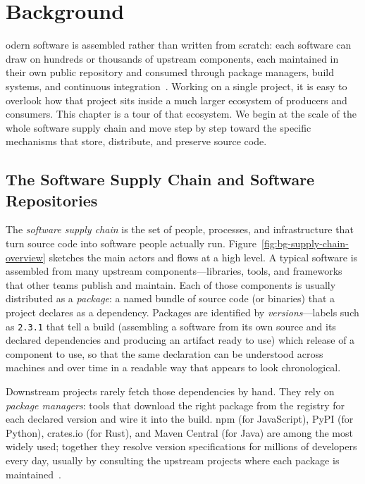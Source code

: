 %
%
\chapter{Background}
\label{chap:background}

odern software is assembled rather than written from scratch: each software can draw on hundreds or thousands of upstream components, each maintained in their own public repository and consumed through package managers, build systems, and continuous integration~\cite{ladisa2023supplychain}.
Working on a single project, it is easy to overlook how that project sits inside a much larger ecosystem of producers and consumers.
This chapter is a tour of that ecosystem.
We begin at the scale of the whole software supply chain and move step by step toward the specific mechanisms that store, distribute, and preserve source code.

\section{The Software Supply Chain and Software Repositories}
\label{sec:bg-software-supply-chain}

The \emph{software supply chain} is the set of people, processes, and infrastructure that turn source code into software people actually run.
Figure~\ref{fig:bg-supply-chain-overview} sketches the main actors and flows at a high level.
A typical software is assembled from many upstream components---libraries, tools, and frameworks that other teams publish and maintain.
Each of those components is usually distributed as a \emph{package}: a named bundle of source code (or binaries) that a project declares as a dependency.
Packages are identified by \emph{versions}---labels such as \texttt{2.3.1} that tell a build (assembling a software from its own source and its declared dependencies and producing an artifact ready to use) which release of a component to use, so that the same declaration can be understood across machines and over time in a readable way that appears to look chronological.

Downstream projects rarely fetch those dependencies by hand.
They rely on \emph{package managers}: tools that download the right package from the registry for each declared version and wire it into the build.
npm (for JavaScript), PyPI (for Python), crates.io (for Rust), and Maven Central (for Java) are among the most widely used; together they resolve version specifications for millions of developers every day, usually by consulting the upstream projects where each package is maintained~\cite{DBLP:conf/msr/PietriSZ20}.

